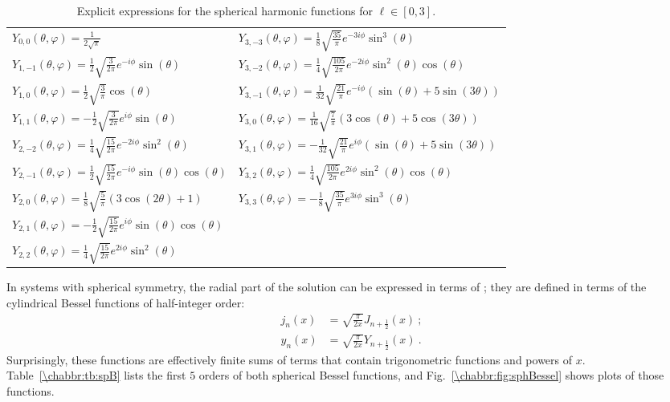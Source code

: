 \begin{table}
\centering\leavevmode
{\small\begin{tabular}{l|l}
$Y_{0,0}(\theta,\varphi)=\frac{1}{2 \sqrt{\pi }} $&$ Y_{3,-3}(\theta,\varphi)=\frac{1}{8} \sqrt{\frac{35}{\pi }} e^{-3 i \phi } \sin ^3(\theta )$\\
$Y_{1,-1}(\theta,\varphi)=\frac{1}{2} \sqrt{\frac{3}{2 \pi }} e^{-i \phi } \sin (\theta ) $&$ Y_{3,-2}(\theta,\varphi)=\frac{1}{4} \sqrt{\frac{105}{2 \pi }} e^{-2 i \phi } \sin ^2(\theta ) \cos (\theta )$\\
$Y_{1,0}(\theta,\varphi)=\frac{1}{2} \sqrt{\frac{3}{\pi }} \cos (\theta )$&$ Y_{3,-1}(\theta,\varphi)=\frac{1}{32} \sqrt{\frac{21}{\pi }} e^{-i \phi } (\sin (\theta )+5 \sin (3 \theta ))$\\
$Y_{1,1}(\theta,\varphi)=-\frac{1}{2} \sqrt{\frac{3}{2 \pi }} e^{i \phi } \sin (\theta ) $&$ Y_{3,0}(\theta,\varphi)=\frac{1}{16} \sqrt{\frac{7}{\pi }} (3 \cos (\theta )+5 \cos (3 \theta ))$\\
$Y_{2,-2}(\theta,\varphi)=\frac{1}{4} \sqrt{\frac{15}{2 \pi }} e^{-2 i \phi } \sin ^2(\theta ) $&$ Y_{3,1}(\theta,\varphi)=-\frac{1}{32} \sqrt{\frac{21}{\pi }} e^{i \phi } (\sin (\theta )+5 \sin (3 \theta ))$\\
$Y_{2,-1}(\theta,\varphi)=\frac{1}{2} \sqrt{\frac{15}{2 \pi }} e^{-i \phi } \sin (\theta ) \cos (\theta )$&$Y_{3,2}(\theta,\varphi)=\frac{1}{4} \sqrt{\frac{105}{2 \pi }} e^{2 i \phi } \sin ^2(\theta ) \cos (\theta )$\\
$Y_{2,0}(\theta,\varphi)=\frac{1}{8} \sqrt{\frac{5}{\pi }} (3 \cos (2 \theta )+1)$&$Y_{3,3}(\theta,\varphi)=-\frac{1}{8} \sqrt{\frac{35}{\pi }} e^{3 i \phi } \sin ^3(\theta )$\\
$Y_{2,1}(\theta,\varphi)=-\frac{1}{2} \sqrt{\frac{15}{2 \pi }} e^{i \phi } \sin (\theta ) \cos (\theta )$&\\
$Y_{2,2}(\theta,\varphi)=\frac{1}{4} \sqrt{\frac{15}{2 \pi }} e^{2 i \phi } \sin ^2(\theta )$&\\
\end{tabular}}
\caption{\label{\chabbr:tb:Ylm}Explicit expressions for the spherical harmonic functions for $\ell\in[0,3]$.}
\end{table}

In systems with spherical symmetry, the radial part of the solution can be expressed in terms of ; they are defined in terms of the cylindrical Bessel functions of half-integer order:
\begin{equation}
\begin{split}
	j_n(x) &= \sqrt{\frac{\pi}{2x}}J_{n+\frac{1}{2}}(x)\ ;\\
	y_n(x) &= \sqrt{\frac{\pi}{2x}}Y_{n+\frac{1}{2}}(x)\ .	
\end{split}
\end{equation}
Surprisingly, these functions are effectively finite sums of terms that contain trigonometric functions and powers of $x$.  Table~\ref{\chabbr:tb:spB}  lists the first $5$ orders of both spherical Bessel functions, and Fig.~\ref{\chabbr:fig:sphBessel} shows plots of those functions.

